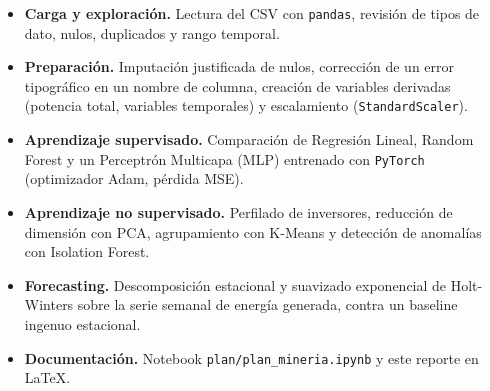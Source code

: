 \begin{itemize}
    \item \textbf{Carga y exploración.} Lectura del CSV con \texttt{pandas}, revisión de tipos de dato, nulos, duplicados y rango temporal.
    \item \textbf{Preparación.} Imputación justificada de nulos, corrección de un error tipográfico en un nombre de columna, creación de variables derivadas (potencia total, variables temporales) y escalamiento (\texttt{StandardScaler}).
    \item \textbf{Aprendizaje supervisado.} Comparación de Regresión Lineal, Random Forest y un Perceptrón Multicapa (MLP) entrenado con \texttt{PyTorch} (optimizador Adam, pérdida MSE).
    \item \textbf{Aprendizaje no supervisado.} Perfilado de inversores, reducción de dimensión con PCA, agrupamiento con K-Means y detección de anomalías con Isolation Forest.
    \item \textbf{Forecasting.} Descomposición estacional y suavizado exponencial de Holt-Winters sobre la serie semanal de energía generada, contra un baseline ingenuo estacional.
    \item \textbf{Documentación.} Notebook \texttt{plan/plan\_mineria.ipynb} y este reporte en \LaTeX{}.
\end{itemize}
